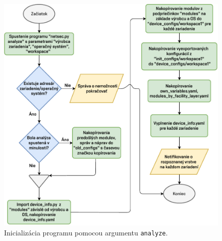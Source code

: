 \vspace{2em}
\begin{figure}[H]
	\begin{center}
		\includegraphics[scale=0.8]{obrazky/netsec_analyze.pdf}
	\end{center}
	\caption[Inicializácia programu pomocou argumentu \texttt{analyze}.]{Inicializácia programu pomocou argumentu \texttt{analyze}.}
	\label{netsec_analyze}
\end{figure}

